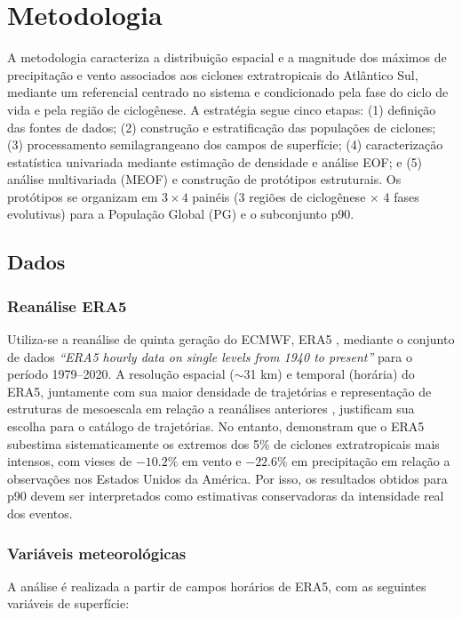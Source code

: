 \chapter{Metodologia}\label{ch:metodologia}
A metodologia caracteriza a distribuição espacial e a magnitude dos máximos de precipitação e vento associados aos ciclones extratropicais do Atlântico Sul, mediante um referencial centrado no sistema e condicionado pela fase do ciclo de vida e pela região de ciclogênese.
A estratégia segue cinco etapas: (1) definição das fontes de dados; (2) construção e estratificação das populações de ciclones; (3) processamento semilagrangeano dos campos de superfície; (4) caracterização estatística univariada mediante estimação de densidade e análise EOF; e (5) análise multivariada (MEOF) e construção de protótipos estruturais.
Os protótipos se organizam em $3 \times 4$ painéis (3 regiões de ciclogênese $\times$ 4 fases evolutivas) para a População Global (PG) e o subconjunto p90.

\section{Dados}\label{sec:datos}
\subsection{Reanálise ERA5}\label{sec:datos_era5}
Utiliza-se a reanálise de quinta geração do ECMWF, ERA5 \citep{hersbach2020era5}, mediante o conjunto de dados \textit{``ERA5 hourly data on single levels from 1940 to present''} \citep{hersbach_era5_2023b} para o período 1979--2020.
A resolução espacial ($\sim$31 km) e temporal (horária) do ERA5, juntamente com sua maior densidade de trajetórias e representação de estruturas de mesoescala em relação a reanálises anteriores \citep{gramcianinov2020analysis}, justificam sua escolha para o catálogo de trajetórias.
No entanto, \citet{chen2024evaluation} demonstram que o ERA5 subestima sistematicamente os extremos dos 5\% de ciclones extratropicais mais intensos, com vieses de $-10.2\%$ em vento e $-22.6\%$ em precipitação em relação a observações nos Estados Unidos da América.
Por isso, os resultados obtidos para p90 devem ser interpretados como estimativas conservadoras da intensidade real dos eventos.

\subsection{Variáveis meteorológicas}\label{subsec:variables}
A análise é realizada a partir de campos horários de ERA5, com as seguintes variáveis de superfície:

